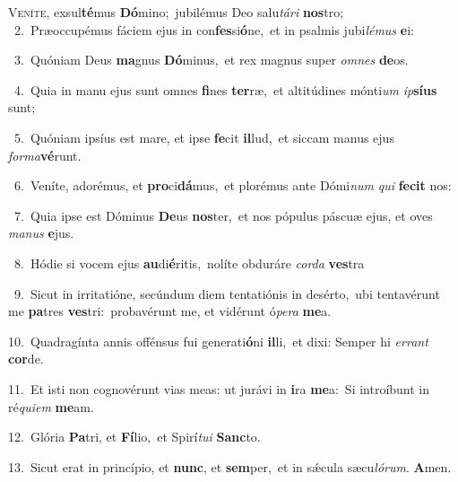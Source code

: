 \lettrine{\initial\textcolor{\initialcolor}{V}}{eníte,} exsul\-\textbf{té}\-mus \textbf{Dó}\-mino;~\star jubilémus Deo salu\-\textit{tá}\-\textit{ri} \textbf{nos}\-tro;\\
{\numbfont\textcolor{\numbcolor}{~2.}}~Præoccupémus fáciem ejus in con\-\textbf{fes}\-si\-\textbf{ó}\-ne,~\star et in psalmis jubi\-\textit{lé}\-\textit{mus} \textbf{e}\-i:\par
{\numbfont\textcolor{\numbcolor}{~3.}}~Quóniam Deus \textbf{ma}\-gnus \textbf{Dó}\-minus,~\star et rex magnus super \textit{om}\-\textit{nes} \textbf{de}\-os.\par
{\numbfont\textcolor{\numbcolor}{~4.}}~Quia in manu ejus sunt omnes \textbf{fi}\-nes \textbf{ter}\-ræ,~\star et altitúdines mónti\textit{um} \textit{ip}\-\textbf{sí}\textbf{us} sunt;\par
{\numbfont\textcolor{\numbcolor}{~5.}}~Quóniam ipsíus est mare, et ipse \textbf{fe}\-cit \textbf{il}\-lud,~\star et siccam manus ejus \textit{for}\-\textit{ma}\textbf{vé}runt.\par
{\numbfont\textcolor{\numbcolor}{~6.}}~Veníte, adorémus, et \textbf{pro}\-ci\-\textbf{dá}\-mus,~\star et plorémus ante Dómi\textit{num} \textit{qui} \textbf{fe}\-\textbf{cit} nos:\par
{\numbfont\textcolor{\numbcolor}{~7.}}~Quia ipse est Dóminus \textbf{De}\-us \textbf{nos}\-ter,~\star et nos pópulus páscuæ ejus, et oves \textit{ma}\-\textit{nus} \textbf{e}\-jus.\par
{\numbfont\textcolor{\numbcolor}{~8.}}~Hódie si vocem ejus \textbf{au}\-di\-\textbf{é}\-ritis,~\star nolíte obduráre \textit{cor}\-\textit{da} \textbf{ves}\-tra\par
{\numbfont\textcolor{\numbcolor}{~9.}}~Sicut in irritatióne, secúndum diem tentatiónis in desérto,~\dagger ubi tentavérunt me \textbf{pa}\-tres \textbf{ves}\-tri:~\star probavérunt me, et vidérunt ó\-\textit{pe}\-\textit{ra} \textbf{me}\-a.\par
{\numbfont\textcolor{\numbcolor}{10.}}~Quadragínta annis offénsus fui generati\-\textbf{ó}\-ni \textbf{il}\-li,~\star et dixi: Semper hi \textit{er}\-\textit{rant} \textbf{cor}\-de.\par
{\numbfont\textcolor{\numbcolor}{11.}}~Et isti non cognovérunt vias meas: ut jurávi in \textbf{i}\-ra \textbf{me}\-a:~\star Si introíbunt in ré\-\textit{qui}\-\textit{em} \textbf{me}\-am.\par
{\numbfont\textcolor{\numbcolor}{12.}}~Glória \textbf{Pa}\-tri, et \textbf{Fí}\-lio,~\star et Spirí\-\textit{tu}\-\textit{i} \textbf{Sanc}\-to.\par
{\numbfont\textcolor{\numbcolor}{13.}}~Sicut erat in princípio, et \textbf{nunc}\-, et \textbf{sem}\-per,~\star et in sǽcula sæcu\-\textit{ló}\-\textit{rum}. \textbf{A}\-men.\par
